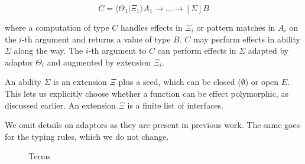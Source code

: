 \documentclass[msc,deptreport,cs]{infthesis} %
\makeatletter
\newcommand\figscale{0.85}
\newcommand{\many}{\overline}
\newcommand\ba{\begin{array}}
\newcommand\ea{\end{array}}
\newenvironment{syntax}{\[\ba{@{}l@{~}r@{~}c@{~}l@{}}}{\ea\]\ignorespacesafterend}
\newcommand{\adapt}{\Theta}
\newcommand{\ext}{\Xi}
\newcommand{\sigs}{\Sigma}
\newcommand{\key}[1]{\mathbf{#1}} %
\newcommand{\handleSymbol}{\rightarrow}
\newcommand{\handle}[2]{{#1} \handleSymbol {#2}}
\newcommand{\thunk}[1]{\{{#1}\}}
\newcommand\slab[1]{(\textrm{#1})}
\newcommand{\ev}{E}
\newcommand{\effin}[1]{\langle {#1} \rangle}
\newcommand{\effout}[1]{[{#1}]}
\newcommand{\nowt}{\emptyset}
\newcommand{\uc}{\mathord{\downarrow}}
\newcommand{\cu}{\mathord{\uparrow}}
\newcommand{\gor}{\mid}
\newcommand{\pipe}{\texttt{|}}
\makeatother
\begin{document}
\[
  C = \effin{\adapt_1\pipe\ext_1}A_1 \to \dots \to \effout{\sigs} B
\]

\noindent where a computation of type $C$ handles effects in $\ext_i$ or pattern
matches in $A_i$ on the $i$-th argument and returns a value of type $B$. $C$ may
perform effects in ability $\sigs$ along the way.
%
The $i$-th argument to $C$ can perform effects in $\sigs$ adapted by adaptor
$\adapt_i$ and augmented by extension $\ext_i$.

An ability $\sigs$ is an extension $\ext$ plus a seed, which can be closed
($\nowt$) or open $\ev$. This lets us explicitly choose whether a function can
be effect polymorphic, as discussed earlier. An extension $\ext$ is a finite
list of interfaces.


We omit details on adaptors as they are present in previous work. The same goes
for the typing rules, which we do not change.

\begin{figure} %
\centering
\scalebox{\figscale}{%
\begin{syntax}
  \slab{constructors}               & k \\
  \slab{commands}                   & c \\
  \slab{uses}                 & m      &::= &
     x \gor f~\many{R} \gor m~\many{n} \gor \cu(n:A) \\
  \slab{constructions}        & n      &::= &
    \uc m \gor k~\many{n} \gor c~\many{R}~\many{n} \gor \thunk{e} \\
                              &        &\gor& \key{let}~f : P = n~\key{in}~n'
                                   \gor
                                   \key{letrec}~\many{f : P = e}~\key{in}~n \\
                              &        &\gor&  \effin{\adapt}~n \\
  \slab{computations}         & e      &::=& \many{\many{r} \mapsto n}
  \\
  \slab{computation patterns} & r      &::=& p
                                        \gor \effin{\handle{c~\many{p}\,}{z}}
                                        \gor \effin{x} \\
  \slab{value patterns}       & p      &::=& k~\many{p} \gor x        \\
\end{syntax}
}
\caption{Terms}
\label{fig:terms}
\end{figure}
\end{document}
